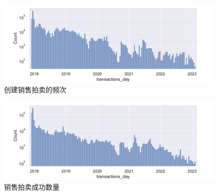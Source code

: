 \documentclass{myreport}
\begin{document}
\begin{figure}[!htbp]
	\centering
	\includegraphics[width=\linewidth]{figure/saleauction count.pdf}
	\caption{创建销售拍卖的频次}
	\label{fig:saleauction count}
\end{figure}
\begin{figure}[!htbp]
	\centering
	\includegraphics[width=\linewidth]{figure/bid count.pdf}
	\caption{销售拍卖成功数量}
	\label{fig:bid count}
\end{figure}
\end{document}
